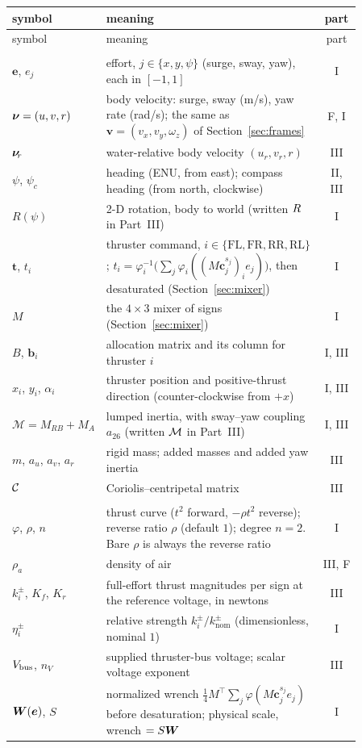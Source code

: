 \small
\setlength{\LTpre}{4pt}\setlength{\LTpost}{0pt}
\begin{longtable}{@{}>{\raggedright}p{0.24\linewidth}>{\raggedright}p{0.62\linewidth}c@{}}
  \toprule
  symbol & meaning & part\tabularnewline
  \midrule
  \endfirsthead
  \toprule
  symbol & meaning & part\tabularnewline
  \midrule
  \endhead
  \bottomrule
  \endfoot
  \multicolumn{3}{@{}l}{\emph{Frames, commands and the boat}}\tabularnewline
  $\bm e$, $e_j$ & effort, $j\in\{x, y, \psi\}$ (surge, sway, yaw), each in $[-1,1]$ & I\tabularnewline
  $\bm{\nu} = (u, v, r)$ & body velocity: surge, sway (m/s), yaw rate (rad/s); the same as $\bm v = (v_x, v_y, \omega_z)$ of Section~\ref{sec:frames} & F, I\tabularnewline
  $\bm{\nu}_{\!r}$ & water-relative body velocity $(u_r, v_r, r)$ & III\tabularnewline
  $\psi$, $\psi_c$ & heading (ENU, from east); compass heading (from north, clockwise) & II, III\tabularnewline
  $R(\psi)$ & 2-D rotation, body to world (written $R$ in Part~III) & I\tabularnewline
  $\bm t$, $t_i$ & thruster command, $i\in\{\text{FL},\text{FR},\text{RR},\text{RL}\}$; $t_i=\varphi_i^{-1}\bigl(\sum_j\varphi_i((M\bm c_j^{s_j})_i e_j)\bigr)$, then desaturated (Section~\ref{sec:mixer}) & I\tabularnewline
  $M$ & the $4\times3$ mixer of signs (Section~\ref{sec:mixer}) & I\tabularnewline
  $B$, $\bm b_i$ & allocation matrix and its column for thruster $i$ & I, III\tabularnewline
  $x_i$, $y_i$, $\alpha_i$ & thruster position and positive-thrust direction (counter-clockwise from $+x$) & I, III\tabularnewline
  $\mathcal M=M_{RB}+M_A$ & lumped inertia, with sway--yaw coupling $a_{26}$ (written $\mathcal{M}$ in Part~III) & I, III\tabularnewline
  $m$, $a_u$, $a_v$, $a_r$ & rigid mass; added masses and added yaw inertia & III\tabularnewline
  $\mathcal{C}$ & Coriolis--centripetal matrix & III\tabularnewline
  \midrule
  \multicolumn{3}{@{}l}{\emph{Thrust and correction}}\tabularnewline
  $\varphi$, $\rho$, $n$ & thrust curve ($t^2$ forward, $-\rho t^2$ reverse); reverse ratio $\rho$ (default $1$); degree $n = 2$. Bare $\rho$ is always the reverse ratio & I\tabularnewline
  $\rho_a$ & density of air & III, F\tabularnewline
  $k_i^\pm$, $K_f$, $K_r$ & full-effort thrust magnitudes per sign at the reference voltage, in newtons & III\tabularnewline
  $\eta_i^\pm$ & relative strength $k_i^\pm/k_{\mathrm{nom}}^\pm$ (dimensionless, nominal $1$) & I\tabularnewline
  $\Vbus$, $n_V$ & supplied thruster-bus voltage; scalar voltage exponent & III\tabularnewline
  $\bm{W}(\bm e)$, $S$ & normalized wrench $\tfrac14 M^\top\sum_j\varphi(M\bm c_j^{s_j}e_j)$ before desaturation; physical scale, wrench $= S\bm{W}$ & I\tabularnewline

\end{longtable}
